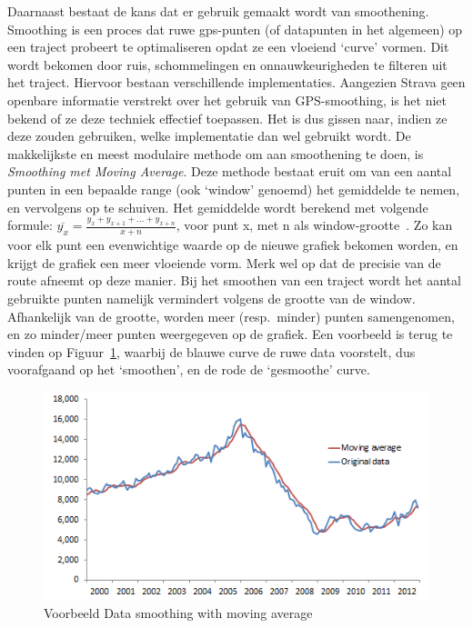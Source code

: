 Daarnaast bestaat de kans dat er gebruik gemaakt wordt van smoothening.
Smoothing is een proces dat ruwe \ac{gps}-punten (of datapunten in het
algemeen) op een traject probeert te optimaliseren opdat ze een vloeiend
`curve' vormen. Dit wordt bekomen door ruis, schommelingen en onnauwkeurigheden
te filteren uit het traject. Hiervoor bestaan verschillende implementaties.
Aangezien Strava geen openbare informatie verstrekt over het gebruik van
GPS-smoothing, is het niet bekend of ze deze techniek effectief toepassen. Het
is dus gissen naar, indien ze deze zouden gebruiken, welke implementatie dan
wel gebruikt wordt. De makkelijkste en meest modulaire methode om aan
smoothening te doen, is \textit{Smoothing met Moving Average}. Deze methode
bestaat eruit om van een aantal punten in een bepaalde range (ook `window'
genoemd) het gemiddelde te nemen, en vervolgens op te schuiven. Het gemiddelde
wordt berekend met volgende formule: $\overline{y_x} = \frac{y_x + y_{x+1} +
        \ldots + y_{x+n}}{x+n}$, voor punt x, met n als
window-grootte~\cite{Smoothin16:online,
    SmoothingandInterpolatingNoisyGPSDatawithSmoothingSplines, Smoothin86:online}.
Zo kan voor elk punt een evenwichtige waarde op de nieuwe grafiek bekomen
worden, en krijgt de grafiek een meer vloeiende vorm. Merk wel op dat de
precisie van de route afneemt op deze manier. Bij het smoothen van een traject
wordt het aantal gebruikte punten namelijk vermindert volgens de grootte van de
window. Afhankelijk van de grootte, worden meer (resp.\ minder) punten
samengenomen, en zo minder/meer punten weergegeven op de grafiek. Een voorbeeld
is terug te vinden op Figuur~\ref{fig:SmoothingExample}, waarbij de blauwe
curve de ruwe data voorstelt, dus voorafgaand op het `smoothen', en de rode de
`gesmoothe' curve.
\begin{figure}[h]
    \centering
    \includegraphics[width=0.6\linewidth]{fig/SmoothingExample.png}
    \caption{Voorbeeld Data smoothing with moving average}\label{fig:SmoothingExample}
\end{figure}

